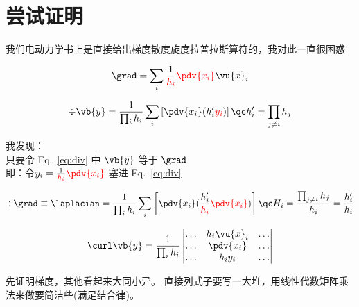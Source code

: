 
\section{尝试证明}%
我们电动力学书上是直接给出梯度散度旋度拉普拉斯算符的，我对此一直很困惑

\begin{definition}[梯度]
	\begin{equation}
		\grad = \sum_i \frac{1}{\textcolor{red}{h_i}} \red{\pdv{x_i}} \vu{x}_i
		\label{eq:梯度}
	\end{equation}
\end{definition}

\begin{definition}[散度]
	\begin{equation}
		\label{eq:div}
		\div \vb{y}  = \frac{1}{\prod_i h_i} \sum_i \left[
			\pdv{x_i}( h'_i \red{y_i})
			\right]
		\qc
		h'_{i} = \prod_{j \neq i}  h_j
	\end{equation}
\end{definition}

我发现：\\
只要令 Eq.~\eqref{eq:div} 中 $\vb{y}$ 等于 $\grad$ \\
即：令$y_i=\frac{1}{\textcolor{red}{h_i}} \red{\pdv{x_i}} $ 塞进 Eq.~\eqref{eq:div}
\begin{definition}[拉普拉斯算子]

	\begin{equation}
		\div \grad \equiv \laplacian = \frac{1}{\prod_i h_i}
		\sum_i
		\left[
			\pdv{x_i}( \frac{h'_i}{\red{h_i}} \red{\pdv{x_i}})
			\right]
		\qc
		H_i = \frac{\prod_{j \neq i} h_j}{ h_i } =\frac{h'_i}{ h_i }
    \label{eq:广义曲线坐标系拉普拉斯算子}
	\end{equation}
\end{definition}


\begin{definition}[旋度]
	\begin{equation}
		\curl \vb{y}  = \frac{1}{\prod_i h_i}
		\begin{vmatrix}
			\ldots & h_i  \vu{x}_i & \ldots \\
			\ldots & \pdv{x_i}     & \ldots \\
			\ldots & h_i y_i       & \ldots
		\end{vmatrix}
	\end{equation}
\end{definition}
先证明梯度，其他看起来大同小异。
直接列式子要写一大堆，用线性代数矩阵乘法来做要简洁些(满足结合律)。
